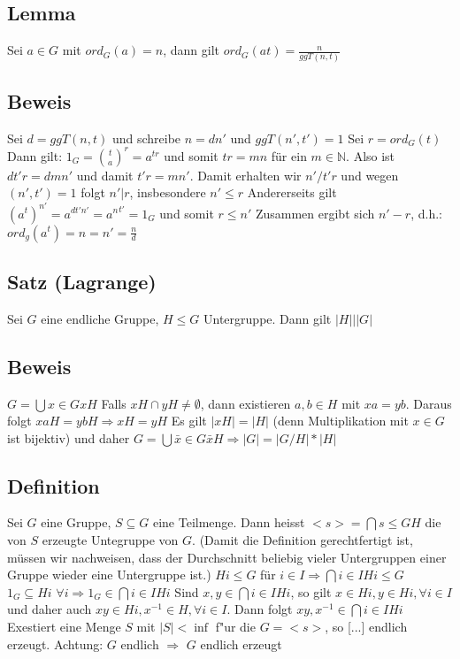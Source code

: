 \documentclass[12pt,a4paper,ngerman]{scrreprt}
\begin{document}
\subsection{Lemma}
Sei $a \in G$ mit $ord_G(a) = n$, dann gilt $ord_G(at) = \frac{n}{ggT(n,t)}$

\subsection{Beweis}
Sei $d = ggT(n,t)$ und schreibe $n = dn'$ und $ggT(n',t') = 1$
Sei $r = ord_G(t)$ %
Dann gilt: $1_G = \binom{t}{a}^r = a^{tr}$ und somit $tr = mn$ für ein $m \in \mathbb{N}$.
Also ist $dt'r = dmn'$ und damit $t'r = mn'$. 
Damit erhalten wir $n'/t'r$ und wegen $(n', t') = 1$ folgt $n'|r$, insbesondere $n' \leq r$
Andererseits gilt $(a^t)^{n'} = a^{dt'n'} = {a^n}^{t'} = 1_G$ und somit $r \leq n'$
Zusammen ergibt sich $n' - r$, d.h.: $ord_g(a^t) = n = n' = \frac{n}{d}$

\subsection{Satz (Lagrange)}
Sei $G$ eine endliche Gruppe, $H \leq G$ Untergruppe. Dann gilt $|H| | |G|$%
\subsection{Beweis}
$G = \bigcup{x\in G}{xH}$ Falls $xH \cap yH \neq \emptyset$, 
dann existieren $a,b \in H$ mit $xa = yb$.
Daraus folgt $xaH = ybH \Rightarrow xH=yH$
Es gilt $|xH| = |H|$ (denn Multiplikation mit $x \in G$ ist bijektiv) und daher
$G = \bigcup{\bar{x} \in G}{\bar{x} H} \Rightarrow |G| = |G/H| * |H|$

\subsection{Definition}
Sei $G$ eine Gruppe, $S \subseteq G$ eine Teilmenge.
Dann heisst $<s> = \bigcap{s \leq G}{H}$ die von $S$ erzeugte Untegruppe von $G$.
(Damit die Definition gerechtfertigt ist, müssen wir nachweisen, dass der Durchschnitt beliebig vieler Untergruppen einer Gruppe wieder eine Untergruppe ist.)
$Hi \leq G$ für $i \in I \Rightarrow \bigcap{i\in I}{Hi} \leq G$
$1_G \subseteq Hi$ 
$\forall i \Rightarrow 1_G \in \bigcap{i\in I}{Hi}$
Sind $x,y \in \bigcap{i\in I} Hi$, so gilt $x \in Hi, y \in Hi, \forall i\in I $
und daher auch
$xy \in Hi, x^{-1} \in H, \forall i \in I$. 
Dann folgt
$xy, x^{-1} \in \bigcap{i\in I}{Hi}$
Exestiert eine Menge $S$ mit $|S| < \inf$ f"ur die $G=<s>$, so [...] endlich erzeugt.
Achtung: $G$ endlich $\Rightarrow$ $G$ endlich erzeugt
\end{document}
